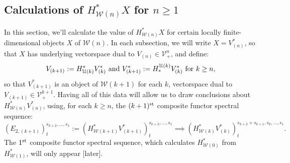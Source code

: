 \documentclass[11pt]{amsart}
\theoremstyle{plain}
\theoremstyle{definition}
\newcommand{\calW}{\mathcal{W}}
\newcommand{\calU}{\mathcal{U}}
\newcommand{\calV}{\mathcal{V}}
\theoremstyle{plain}
\newcommand{\vect}[2]{\calV^{#1}_{#2}}
\begin{document}
\begin{Calculations of HWn for n nonzero}
\section{Calculations of $H^*_{\calW(n)}X$ for $n\geq 1$}
In this section, we'll calculate the value of $H^*_{\calW(n)}X$ for certain locally finite-dimensional objects $X$ of $\calW(n)$. In each subsection, we will write $X=V^*_{(n)}$, so that $X$ has underlying vectorspace dual to $V_{{(n)}}\in\vect{n}{+}$, and define:
\[V_{(k+1)}:=H^*_{\calU(k)}V^*_{(k)}\textup{ and }V^*_{(k+1)}:=H_*^{\calU(k)}V^*_{(k)}\textup{ for $k\geq n$},\]
so that $V^*_{(k+1)}$ is an object of $\calW(k+1)$ for each $k$, vectorspace dual to $V_{(k+1)}\in\vect{k+1}{+}$.
Having all of this data will allow us to draw conclusions about $H^*_{\calW(n)}V^*_{(n)}$, using, for each $k\geq n$, the $(k+1)^{\textup{st}}$ composite functor spectral sequence:
\[(E_{2,(k+1)})^{s_{k+2},\ldots,s_1}_{t}:=(H^*_{\calW(k+1)}V^*_{(k+1)})^{s_{k+2},\ldots,s_1}_{t}\implies (H^*_{\calW(k)}V^*_{(k)})^{s_{k+2}+s_{k+1},s_k,\ldots,s_1}_{t}.\]
The $1^{\textup{st}}$ composite functor spectral sequence, which calculates $H^{*}_{\calW(0)}$ from $H^{*}_{\calW(1)}$, will only appear [later].




\end{Calculations of HWn for n nonzero}
\end{document}
